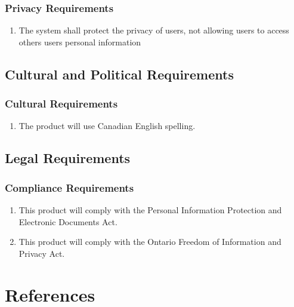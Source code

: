 \documentclass[english]{article}
\begin{document}
\subsubsection{Privacy Requirements}
\label{ssub:privacy_requirements}
\begin{enumerate}[{SPR}1. ]
\item The system shall protect the privacy of users, not allowing users to access others users personal information
\end{enumerate}


\subsection{Cultural and Political Requirements}
\label{sub:cultural_and_political_requirements}

\subsubsection{Cultural Requirements}
\label{ssub:cultural_requirements}
\begin{enumerate}[{CCR}1. ]
\item The product will use Canadian English spelling.
\end{enumerate}


\subsection{Legal Requirements}
\label{sub:legal_requirements}

\subsubsection{Compliance Requirements}
\label{ssub:compliance_requirements}
\begin{enumerate}[{LCR}1. ]
\item This product will comply with the Personal Information Protection and Electronic Documents Act.
	\item This product will comply with the Ontario Freedom of Information and Privacy Act.
\end{enumerate}


\section{References}
\label{sub:references}


\end{document}
